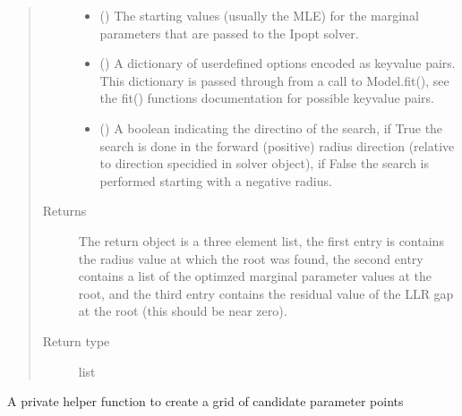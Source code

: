 \documentclass[letterpaper,10pt,english,openany,oneside]{sphinxmanual}
\begin{document}
\begin{fulllineitems}
\begin{fulllineitems}
\begin{quote}
\begin{description}
\begin{itemize}
\item {} 
 (\sphinxstyleliteralemphasis{\sphinxupquote{, }}) \textendash{} The starting values (usually the MLE) for the
marginal parameters that are passed to the Ipopt solver.

\item {} 
 () \textendash{} A dictionary of user\sphinxhyphen{}defined options encoded as key\sphinxhyphen{}value
pairs. This dictionary is passed through from a call to Model.fit(), see
the fit() functions documentation for possible key\sphinxhyphen{}value pairs.

\item {} 
 () \textendash{} A boolean indicating the directino of the search, if True the search
is done in the forward (positive) radius direction (relative to direction specidied
in solver object), if False the search is performed starting with a negative radius.

\end{itemize}

\item[{Returns}] \leavevmode
The return object is a three element list, the first entry is  contains the radius
value at which the root was found, the second entry contains a list of the optimzed marginal
parameter values at the root, and the third entry contains the residual value of the LLR
gap at the root (this should be near zero).

\item[{Return type}] \leavevmode
list

\end{description}\end{quote}

\end{fulllineitems}


\begin{fulllineitems}
\label{\detokenize{nloed:nloed.model.Model.__create_grid}}
A private helper function to create a grid of candidate parameter points


\end{fulllineitems}
\end{fulllineitems}
\end{document}

